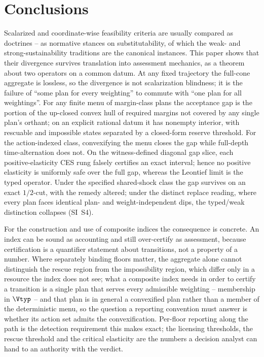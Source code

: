 \section{Conclusions}\label{sec:conclusions}

Scalarized and coordinate-wise feasibility criteria are usually compared as doctrines -- as normative stances on substitutability, of which the weak- and strong-sustainability traditions are the canonical instances. This paper shows that their divergence survives translation into assessment mechanics, as a theorem about two operators on a common datum. At any fixed trajectory the full-cone aggregate is lossless, so the divergence is not scalarization blindness; it is the failure of ``some plan for every weighting'' to commute with ``one plan for all weightings''. For any finite menu of margin-class plans the acceptance gap is the portion of the up-closed convex hull of required margins not covered by any single plan's orthant; on an explicit rational datum it has nonempty interior, with rescuable and impossible states separated by a closed-form reserve threshold. For the action-indexed class, convexifying the menu closes the gap while full-depth time-alternation does not. On the witness-defined diagonal gap slice, each positive-elasticity CES rung falsely certifies an exact interval; hence no positive elasticity is uniformly safe over the full gap, whereas the Leontief limit is the typed operator. Under the specified shared-shock class the gap survives on an exact $1/2$-cut, with the remedy altered; under the distinct replace reading, where every plan faces identical plan- and weight-independent dips, the typed/weak distinction collapses (SI~S4).

For the construction and use of composite indices the consequence is concrete. An index can be sound as accounting and still over-certify as assessment, because certification is a quantifier statement about transitions, not a property of a number. Where separately binding floors matter, the aggregate alone cannot distinguish the rescue region from the impossibility region, which differ only in a resource the index does not see; what a composite index needs in order to certify a transition is a single plan that serves every admissible weighting -- membership in $\Vtyp$ -- and that plan is in general a convexified plan rather than a member of the deterministic menu, so the question a reporting convention must answer is whether its action set admits the convexification. Per-floor reporting along the path is the detection requirement this makes exact; the licensing thresholds, the rescue threshold and the critical elasticity are the numbers a decision analyst can hand to an authority with the verdict.
